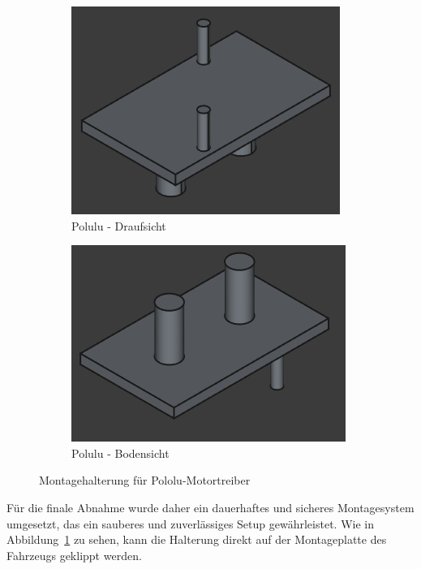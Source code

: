 \begin{figure}[h]
    \centering

    \begin{subfigure}[b]{0.25\textwidth}
        \centering
        \includegraphics[width=\textwidth]{images/cad_polulu_front.png}
        \caption{Polulu - Draufsicht}
    \end{subfigure}
    \hspace{0.05\textwidth} %
    \begin{subfigure}[b]{0.25\textwidth}
        \centering
        \includegraphics[width=\textwidth]{images/cad_polulu_back.png}
        \caption{Polulu - Bodensicht}
    \end{subfigure}

    \caption{Montagehalterung für Pololu-Motortreiber}
    \label{fig:pololu_mounting}
\end{figure}

Für die finale Abnahme wurde daher ein dauerhaftes und sicheres Montagesystem umgesetzt, das ein sauberes und zuverlässiges Setup gewährleistet. Wie in Abbildung~\ref{fig:pololu_mounting} zu sehen, kann die Halterung direkt auf der Montageplatte des Fahrzeugs geklippt werden.